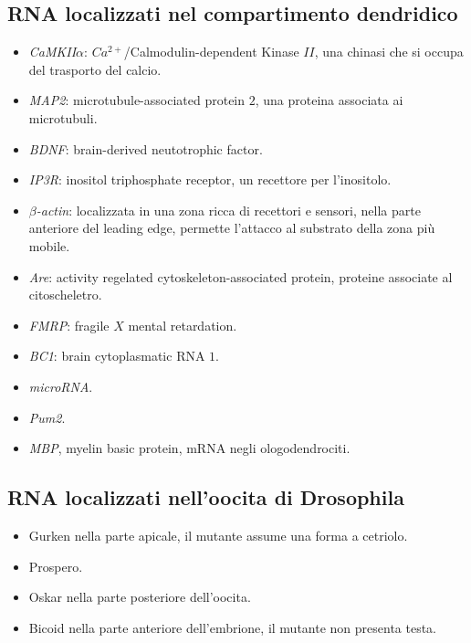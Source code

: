 	\subsection{RNA localizzati nel compartimento dendridico}
	\begin{multicols}{2}
		\begin{itemize}
			\item \emph{CaMKII$\alpha$}: \emph{$Ca^{2+}$}/Calmodulin-dependent Kinase $II$, una chinasi che si occupa del trasporto del calcio.
			\item \emph{MAP2}: microtubule-associated protein $2$, una proteina associata ai microtubuli.
			\item \emph{BDNF}: brain-derived neutotrophic factor.
			\item \emph{IP3R}: inositol triphosphate receptor, un recettore per l'inositolo.
			\item \emph{$\beta$-actin}: localizzata in una zona ricca di recettori e sensori, nella parte anteriore del leading edge, permette l'attacco al substrato della zona pi\`u mobile.
			\item \emph{Are}: activity regelated cytoskeleton-associated protein, proteine associate al citoscheletro.
			\item \emph{FMRP}: fragile $X$ mental retardation.
			\item \emph{BC1}: brain cytoplasmatic RNA $1$.
			\item \emph{microRNA}.
			\item \emph{Pum2}.
			\item \emph{MBP}, myelin basic protein, mRNA negli ologodendrociti.
		\end{itemize}
	\end{multicols}

	\subsection{RNA localizzati nell'oocita di Drosophila}
	\begin{multicols}{2}
		\begin{itemize}
			\item Gurken nella parte apicale, il mutante assume una forma a cetriolo.
			\item Prospero.
			\item Oskar nella parte posteriore dell'oocita.
			\item Bicoid nella parte anteriore dell'embrione, il mutante non presenta testa.
		\end{itemize}
	\end{multicols}

